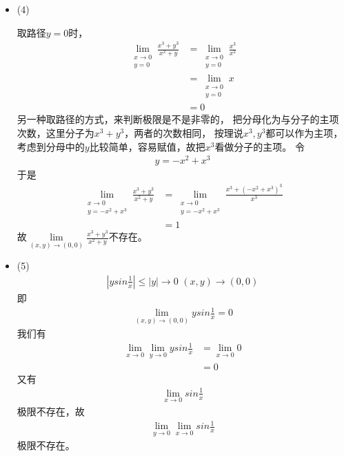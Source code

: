 \documentclass{article}
\begin{document}
\begin{itemize}
  \item (4)

        取路径$y = 0$时，
        \begin{align*}
          \lim\limits_{\substack{x \to 0      \\ y = 0}} \frac{x^3 + y^3}{x^2 + y}
           & = \lim\limits_{\substack{x \to 0 \\ y = 0}} \frac{x^3}{x^2} \\
           & = \lim\limits_{\substack{x \to 0 \\ y = 0}} x               \\
           & = 0
        \end{align*}
        另一种取路径的方式，来判断极限是不是非零的，
        把分母化为与分子的主项次数，这里分子为$x^3 + y^3$，两者的次数相同，
        按理说$x^3, y^3$都可以作为主项，
        考虑到分母中的$y$比较简单，容易赋值，故把$x^3$看做分子的主项。
        令
        \begin{align*}
          y = -x^2 + x^3
        \end{align*}
        于是
        \begin{align*}
          \lim\limits_{\substack{x \to 0      \\ y = -x^2 + x^3}} \frac{x^3 + y^3}{x^2 + y}
           & = \lim\limits_{\substack{x \to 0 \\ y = -x^2 + x^3}} \frac{x^3 + (-x^2 + x^3)^3}{x^3} \\
           & = 1
        \end{align*}
        故$\lim\limits_{(x, y) \to (0, 0)} \frac{x^3 + y^3}{x^2 + y}$不存在。

  \item (5)
        \begin{align*}
          |ysin\frac{1}{x}| \leq |y| \to 0 \,\, (x, y) \to (0, 0)
        \end{align*}
        即
        \begin{align*}
          \lim\limits_{(x, y) \to (0, 0)} ysin\frac{1}{x} = 0
        \end{align*}
        我们有
        \begin{align*}
          \lim\limits_{x \to 0} \lim\limits_{y \to 0} ysin\frac{1}{x}
           & = \lim\limits_{x \to 0} 0 \\
           & = 0
        \end{align*}
        又有
        \begin{align*}
          \lim\limits_{x \to 0} sin\frac{1}{x}
        \end{align*}
        极限不存在，故
        \begin{align*}
          \lim\limits_{y \to 0} \lim\limits_{x \to 0} sin\frac{1}{x}
        \end{align*}
        极限不存在。


\end{itemize}
\end{document}
